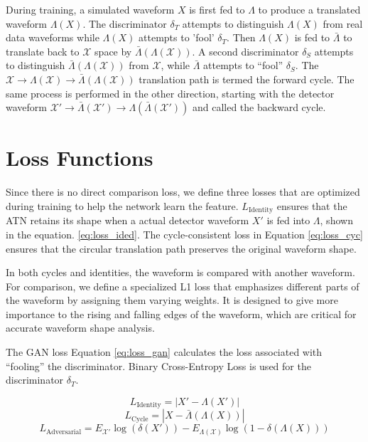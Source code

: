 During training, a simulated waveform $X$ is first fed to $\Lambda$ to produce a translated waveform $\Lambda(X)$. The discriminator $\delta_{T}$ attempts to distinguish $\Lambda(X)$ from real data waveforms while $\Lambda(X)$ attempts to 'fool' $\delta_{T}$. Then $\Lambda(X)$ is fed to $\bar{\Lambda}$ to translate back to $\mathcal{X}$ space by $\bar{\Lambda}(\Lambda(\mathcal{X}))$. A second discriminator $\delta_{S}$ attempts to distinguish $\bar{\Lambda}(\Lambda(\mathcal{X}))$ from $\mathcal{X}$, while $\bar{\Lambda}$ attempts to ``fool'' $\delta_{S}$. The $\mathcal{X}\rightarrow{}\Lambda(\mathcal{X})\rightarrow{}\bar{\Lambda}(\Lambda(\mathcal{X}))$ translation path is termed the forward cycle. The same process is performed in the other direction, starting with the detector waveform $\mathcal{X}'\rightarrow{}\bar{\Lambda}(\mathcal{X}')\rightarrow{}\Lambda(\bar{\Lambda}(\mathcal{X}'))$ and called the backward cycle.

\section{Loss Functions}


Since there is no direct comparison loss, we define three losses that are optimized during training to help the network learn the feature. $L_{\mathrm{Identity}}$ ensures that the ATN retains its shape when a actual detector waveform $X'$ is fed into $\Lambda$, shown in the equation. \ref{eq:loss_ided}. The cycle-consistent loss in Equation \ref{eq:loss_cyc} ensures that the circular translation path preserves the original waveform shape. 

In both cycles and identities, the waveform is compared with another waveform. For comparison, we define a specialized L1 loss that emphasizes different parts of the waveform by assigning them varying weights. It is designed to give more importance to the rising and falling edges of the waveform, which are critical for accurate waveform shape analysis.


The GAN loss Equation \ref{eq:loss_gan} calculates the loss associated with ``fooling'' the discriminator.  Binary Cross-Entropy Loss is used for the discriminator $\delta_{T}$.

\begin{equation}\label{eq:loss_ided}
    L_{\mathrm{Identity}} = |X' - \Lambda(X')|
\end{equation}
\begin{equation}\label{eq:loss_cyc}
    L_{\mathrm{Cycle}} = |X - \bar{\Lambda}(\Lambda(X))|
\end{equation}
\begin{equation}\label{eq:loss_gan}
    L_{\mathrm{Adversarial}} = E_{\mathcal{X'}}\log(\delta(X')) - E_{\Lambda(\mathcal{X})}\log(1 - \delta(\Lambda(X)))
\end{equation}

